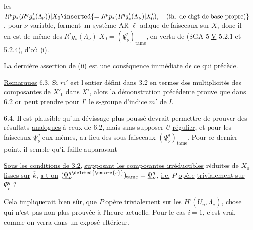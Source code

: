 
les $R^p p_*(R^qg'_*(\Lambda_\nu))|X_0\inserted{=R^p p_*(R^qg'_*(\Lambda_\nu)|X'_0),\quad\text{(th. de chgt de base propre)}}$, pour $\nu$ variable, forment un système AR-$\ell$-adique de faisceaux sur $X$, donc il en est de même des $R^i g_*(\Lambda_\nu)|X_0=(\underline{\Psi}_\nu^i)_{\mathrm{tame}}$, en vertu de (SGA 5 \uline{V} 5.2.1 et 5.2.4), d'où (i).

La dernière assertion de (ii)  est une conséquence immédiate de ce qui précède.

\uline{Remarques} 6.3. Si $m'$ est l'entier défini dans 3.2 en termes des multiplicités des composantes de $X'_0$ dans $X'$, alors la démonstration précédente prouve que dans 6.2 on peut prendre pour $I'$ le s-groupe  d'indice $m'$ de $I$.

6.4. Il est plausible qu'un dévissage plus poussé devrait permettre de prouver des résultats \uline{analogues} à ceux de 6.2, mais sans supposer $U$ \uline{régulier}, et pour les faisceaux $\underline{\Psi}_\nu^q$ eux-mêmes, au lieu des sous-faisceaux $(\underline{\Psi}_\nu^q)_{\mathrm{tame}}$. Pour ce dernier point, il semble qu'il faille auparavant   

\uline{Sous les conditions de 3.2}, \uline{supposant les composantes irréductibles}  réduites de $X_0$ \uline{lisses sur} $\overline{k}$,   \uline{a-t-on} $(\underline{\Psi}_\nu^{q\deleted{\unsure{s}}})_{\mathrm{tame}}=\underline{\Psi}_\nu^q$, \uline{i.e.} $P$ \uline{opère} \uline{trivialement sur}  $\underline{\Psi}_\nu^q$ ? 

Cela impliquerait bien sûr,  que $P$ opère trivialement sur les $H^i(U_{\overline\eta},\Lambda_\nu)$, chose qui n'est pas non plus prouvée à l'heure actuelle.  Pour le cas $i=1$, c'est vrai,  comme on verra dans un exposé ultérieur.


